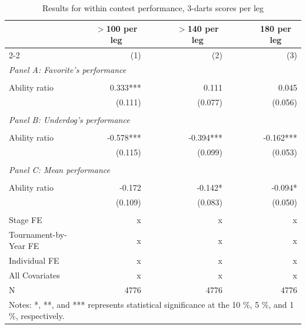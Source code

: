 \documentclass[11pt,a4paper]{article}
\begin{document}
	\begin{table}[H]
		\centering
		\caption{Results for within contest performance, 3-darts scores per leg} 
		\label{apptab:table_base_1_180}
		\begin{tabular}{l r r r r r } 
			\toprule
			\toprule
			& \multicolumn{1}{c}{\textbf{$>$100 per leg}} & ~~~ &  \multicolumn{1}{c}{\textbf{$>$140 per leg}} & ~~~ &  \multicolumn{1}{c}{\textbf{180 per leg}} \\
            \cline{2-2} \cline{4-4} \cline{6-6} \rule{0pt}{3ex}   
			        & (1)        & ~ & (2)   & ~ & (3)     \\ 
			\midrule
			\multicolumn{6}{l}{\textit{Panel A: Favorite's performance}}      \\
            \rule{0pt}{0.01ex}\\
			Ability ratio            & 0.333***    & & 0.111     & & 0.045   \\
			                         & (0.111)     & & (0.077)   & & (0.056)  \\
            \rule{0pt}{0.3ex}\\
			\multicolumn{6}{l}{\textit{Panel B: Underdog's performance}}  \\
            \rule{0pt}{0.01ex}\\
			Ability ratio            & -0.578***   & & -0.394*** & & -0.162***  \\
			                         & (0.115)     & & (0.099)   & & (0.053)     \\
            \rule{0pt}{0.3ex}\\
			\multicolumn{6}{l}{\textit{Panel C: Mean performance}}   \\
            \rule{0pt}{0.01ex}\\
			Ability ratio            & -0.172      & & -0.142*   & & -0.094*  \\
			                         & (0.109)     & & (0.083)   & & (0.050)     \\
            \rule{0pt}{0.3ex}\\
			\midrule
			Stage FE ~~ & x  & & x & & x  \\ 
			Tournament-by-Year FE    & x  & & x & & x  \\ 
			Individual FE            & x  & & x & & x  \\ 
			All Covariates           & x  & & x & & x  \\
			\midrule 
			N                        &  4776    & &  4776   & &   4776   \\ 
			\bottomrule
			\bottomrule
			\multicolumn{6}{l}{\footnotesize Notes: *, **, and *** represents statistical significance at the 10 \%, 5 \%, and 1 \%, respectively. }\\

\end{tabular}
\end{table}
\end{document}
